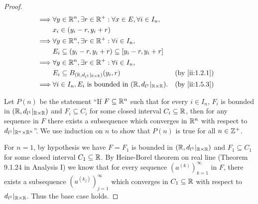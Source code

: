 \begin{proof}
\begin{align*}
    \implies & \forall y \in \R^n, \exists r \in \R^+ : \forall x \in E, \forall i \in I_n,                                                  \\
             & x_i \in (y_i - r, y_i + r)                                                                                                    \\
    \implies & \forall y \in \R^n, \exists r \in \R^+ : \forall i \in I_n,                                                                   \\
             & E_i \subseteq (y_i - r, y_i + r) \subseteq [y_i - r, y_i + r]                                                                 \\
    \implies & \forall y \in \R^n, \exists r \in \R^+ : \forall i \in I_n,                                                                   \\
             & E_i \subseteq B_{(\R, d_{l^1}|_{\R \times \R})}(y_i, r)                                                       &  & \by{ii:1.2.1} \\
    \implies & \forall i \in I_n, E_i \text{ is bounded in } (\R, d_{l^1}|_{\R \times \R}).                                  &  & \by{ii:1.5.3}
  \end{align*}

  Let \(P(n)\) be the statement ``If \(F \subseteq \mathbb{R}^n\) such that for every \(i \in I_n\), \(F_i\) is bounded in \((\mathbb{R}, d_{l^1}|_{\mathbb{R} \times \mathbb{R}})\) and \(F_i \subseteq C_i\) for some closed interval \(C_i \subseteq \mathbb{R}\), then for any sequence in \(F\) there exists a subsequence which converges in \(\mathbb{R}^n\) with respect to \(d_{l^1}|_{\mathbb{R}^n \times \mathbb{R}^n}\)''.
  We use induction on \(n\) to show that \(P(n)\) is true for all \(n \in \mathbb{Z}^+\).

  For \(n = 1\), by hypothesis we have \(F = F_1\) is bounded in \((\mathbb{R}, d_{l^1}|_{\mathbb{R} \times \mathbb{R}})\) and \(F_1 \subseteq C_1\) for some closed interval \(C_1 \subseteq \mathbb{R}\).
  By Heine-Borel theorem on real line (Theorem 9.1.24 in Analysis I) we know that for every sequence \((a^{(k)})_{k = 1}^\infty\) in \(F\), there exists a subsequence \((a^{(k_j)})_{j = 1}^\infty\) which converges in \(C_1 \subseteq \mathbb{R}\) with respect to \(d_{l^1}|_{\mathbb{R} \times \mathbb{R}}\).
  Thus the base case holds.


\end{proof}
